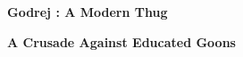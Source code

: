 \begin{center}

{\HUGE \bfseries Godrej : A Modern Thug}

\vspace{2in}

{\Huge \bfseries A Crusade Against Educated Goons}


\end{center}